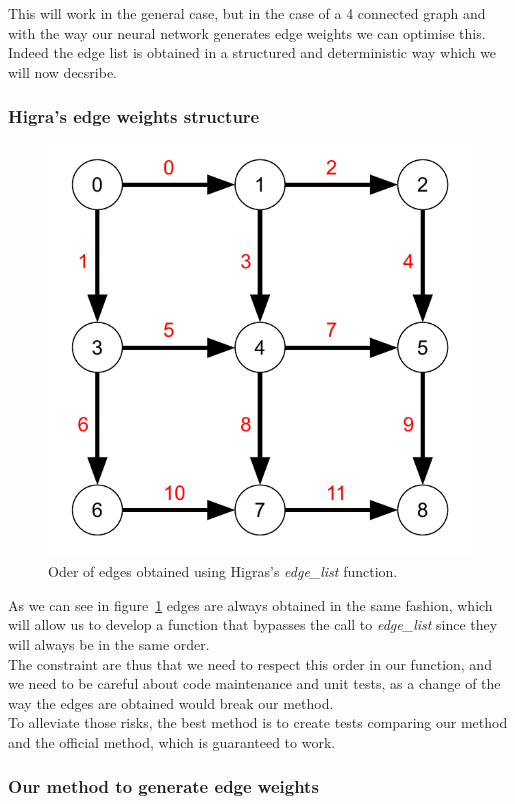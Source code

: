 This will work in the general case, but in the case of a 4 connected graph and
with the way our neural network generates edge weights we can optimise this.
Indeed the edge list is obtained in a structured and deterministic way which
we will now decsribe.


\subsubsection{Higra's edge weights structure}

\begin{figure}[!htbp]
	\centering
	\includegraphics[width=0.4\linewidth]{./images/graph-order.pdf}
	\caption{Oder of edges obtained using Higras's \textit{edge\_list}
	function.}%
	\label{fig:graph_order}
\end{figure}

As we can see in figure~\ref{fig:graph_order} edges are always obtained in the
same fashion, which will allow us to develop a function that bypasses the call
to \textit{edge\_list} since they will always be in the same order.\\
The constraint are thus that we need to respect this order in our function, and
we need to be careful about code maintenance and unit tests, as a change of the
way the edges are obtained would break our method.\\
To alleviate those risks, the best method is to create tests comparing our
method and the official method, which is guaranteed to work.


\subsubsection{Our method to generate edge weights}

